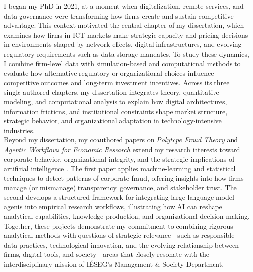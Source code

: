 \documentclass{nfr}
\begin{document}
I began my PhD in 2021, at a moment when digitalization, remote services, and data governance were transforming how firms create and sustain competitive advantage. 
This context motivated the central chapter of my dissertation, which examines how firms in ICT markets make strategic capacity and pricing decisions in environments shaped by network effects, digital infrastructures, and evolving regulatory requirements such as data-storage mandates. 
To study these dynamics, I combine firm-level data with simulation-based and computational methods to evaluate how alternative regulatory or organizational choices influence competitive outcomes and long-term investment incentives. 
Across its three single-authored chapters, my dissertation integrates theory, quantitative modeling, and computational analysis to explain how digital architectures, information frictions, and institutional constraints shape market structure, strategic behavior, and organizational adaptation in technology-intensive industries.\\

Beyond my dissertation, my coauthored papers on \textit{Polytope Fraud Theory} and \textit{Agentic Workflows for Economic Research} extend my research interests toward corporate behavior, organizational integrity, and the strategic implications of artificial intelligence \citep{Zhao2025, Dawid2025}. 
The first paper applies machine-learning and statistical techniques to detect patterns of corporate fraud, offering insights into how firms manage (or mismanage) transparency, governance, and stakeholder trust. 
The second develops a structured framework for integrating large-language-model agents into empirical research workflows, illustrating how AI can reshape analytical capabilities, knowledge production, and organizational decision-making. 
Together, these projects demonstrate my commitment to combining rigorous analytical methods with questions of strategic relevance—such as responsible data practices, technological innovation, and the evolving relationship between firms, digital tools, and society—areas that closely resonate with the interdisciplinary mission of IÉSEG’s Management \& Society Department.\\
\end{document}
